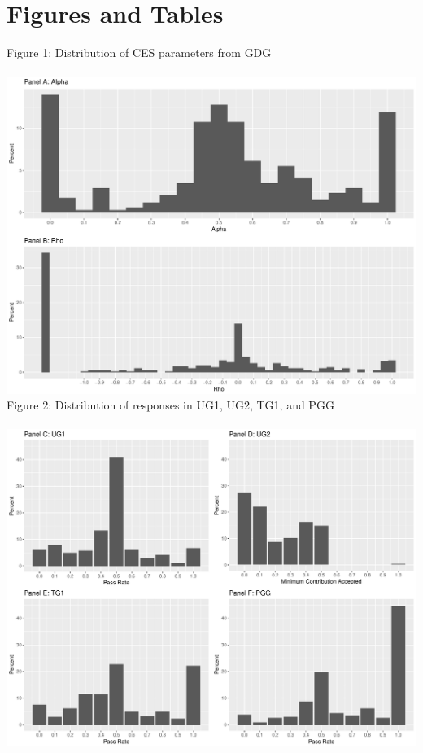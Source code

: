 \documentclass[12pt]{article}
\begin{document}
{\newpage


\section{Figures and Tables} \label{app:d}

\noindent Figure 1: Distribution of CES parameters from GDG \\ \\
\includegraphics[scale=0.4]{Figure2a.pdf} \\



\noindent Figure 2: Distribution of responses in UG1, UG2, TG1, and PGG \\ \\
\includegraphics[scale=0.4]{Figure2b.pdf} \\

}
\end{document}
